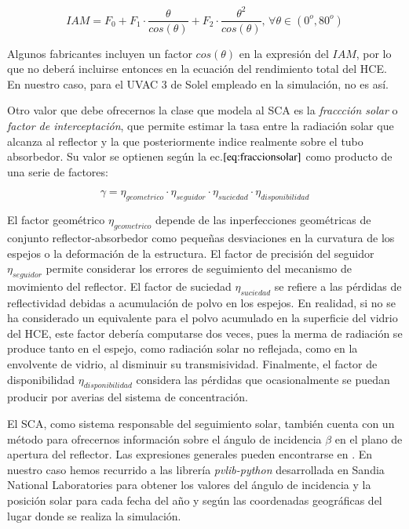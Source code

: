 \documentclass[12pt]{report} %
\begin{document}
\begin{equation}
   IAM = F_0 + F_1 \cdot \frac{\theta}{cos(\theta)} + F_2 \cdot \frac{\theta^2}{cos(\theta)},\, \forall   
 \theta \in (0^o, 80^o)
    \label{eq:iam}
\end{equation}

Algunos fabricantes incluyen un factor \(cos(\theta)\) en la expresión del \(IAM\), por lo que no deberá incluirse entonces en la ecuación del rendimiento total del HCE. En nuestro caso, para el UVAC 3 de Solel empleado en la simulación, no es así.

Otro valor que debe ofrecernos la clase que modela al SCA es la \emph{fraccción solar} o \emph{factor de interceptación}, que permite estimar la tasa entre la radiación solar que alcanza al reflector y la que posteriormente indice realmente sobre el tubo absorbedor. Su valor se optienen según la ec.\(\eqref{eq:fraccionsolar}\) como producto de una serie de factores: 

\begin{equation}
   \gamma = \eta_{geometrico} \cdot \eta_{seguidor} \cdot \eta_{suciedad} \cdot \eta_{disponibilidad}
    \label{eq:fraccionsolar}
\end{equation}

El factor geométrico \(\eta_{geometrico}\) depende de las inperfecciones geométricas de conjunto reflector-absorbedor como pequeñas desviaciones en la curvatura de los espejos o la deformación de la estructura. El factor de precisión del seguidor \(\eta_{seguidor}\) permite considerar los errores de seguimiento del mecanismo de movimiento del reflector. El factor de suciedad \(\eta_{suciedad}\) se refiere a las pérdidas de reflectividad debidas a acumulación de polvo en los espejos. En realidad, si no se ha considerado un equivalente para el polvo acumulado en la superficie del vidrio del HCE, este factor debería computarse dos veces, pues la merma de radiación se produce tanto en el espejo, como radiación solar no reflejada, como en la envolvente de vidrio, al disminuir su transmisividad. Finalmente, el factor de disponibilidad \(\eta_{disponibilidad}\) considera las pérdidas que ocasionalmente se puedan producir por averias del sistema de concentración.

El SCA, como sistema responsable del seguimiento solar, también cuenta con un método para ofrecernos información sobre el ángulo de incidencia \(\beta\) en el plano de apertura del reflector. Las expresiones generales pueden encontrarse en \cite{1022085/95AM6AQN}. En nuestro caso hemos recurrido a las librería \emph{pvlib-python} \cite{1022085/GUC54R5I} desarrollada en Sandia National Laboratories para obtener los valores del ángulo de incidencia y la posición solar para cada fecha del año y según las coordenadas geográficas del lugar donde se realiza la simulación.
\end{document}
